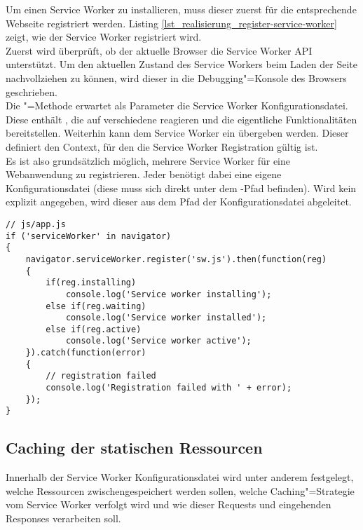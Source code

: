 Um einen Service Worker zu installieren, muss dieser zuerst für die entsprechende Webseite registriert werden. Listing \ref{lst_realisierung_register-service-worker} zeigt, wie der Service Worker registriert wird.\\
Zuerst wird überprüft, ob der aktuelle Browser die Service Worker API unterstützt. Um den aktuellen Zustand des Service Workers beim Laden der Seite nachvollziehen zu können, wird dieser in die Debugging"=Konsole des Browsers geschrieben.\\
Die "=Methode erwartet als Parameter die Service Worker Konfigurationsdatei. Diese enthält , die auf verschiedene  reagieren und die eigentliche Funktionalitäten bereitstellen. Weiterhin kann dem Service Worker ein  übergeben werden. Dieser definiert den Context, für den die Service Worker Registration gültig ist. \\
Es ist also grundsätzlich möglich, mehrere Service Worker für eine Webanwendung zu registrieren. Jeder  benötigt dabei eine eigene Konfigurationsdatei (diese muss sich direkt unter dem -Pfad befinden). Wird kein  explizit angegeben, wird dieser aus dem Pfad der Konfigurationsdatei abgeleitet. \\

\begin{lstlisting}[caption={Einrichtung Service Worker},label={lst_realisierung_register-service-worker}, frame=single]
// js/app.js
if ('serviceWorker' in navigator)
{
    navigator.serviceWorker.register('sw.js').then(function(reg) 
    {
        if(reg.installing)
            console.log('Service worker installing');
        else if(reg.waiting)
            console.log('Service worker installed');
        else if(reg.active)
            console.log('Service worker active');
    }).catch(function(error)
    {
        // registration failed
        console.log('Registration failed with ' + error);
    });
}
\end{lstlisting}

\newpage
\subsection{Caching der statischen Ressourcen}

Innerhalb der Service Worker Konfigurationsdatei wird unter anderem festgelegt, welche Ressourcen zwischengespeichert werden sollen, welche Caching"=Strategie vom Service Worker verfolgt wird und wie dieser Requests und eingehenden Responses verarbeiten soll. 

